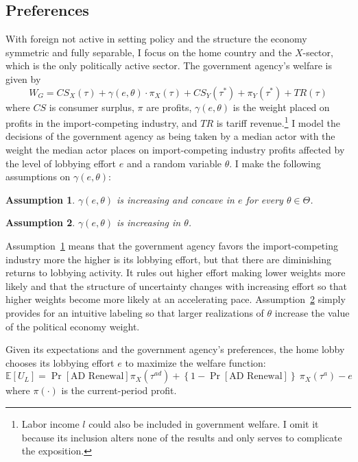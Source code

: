 \documentclass[10pt]{article}
\newtheorem{assumption}{Assumption}
\newcommand{\ve}{\theta}
\newcommand{\ta}{\theta}
\newcommand{\expect}{\mathbb{E}}
\newcommand{\ga}{\gamma}
\begin{document}
\subsection{Preferences}
\label{sec:pref}
With foreign not active in setting policy and the structure the economy symmetric and fully separable, I focus on the home country and the $X$-sector, which is the only politically active sector. The government agency's welfare is given by
\begin{equation}
  W_{\mathit{G}} = \mathit{CS}_X(\tau) + \ga(e,\ve) \cdot \pi_X(\tau) + \mathit{CS}_Y(\tau^*) + \pi_Y(\tau^*) + \mathit{TR}(\tau)
  \label{eq:ml}
\end{equation}
where $\mathit{CS}$ is consumer surplus, $\pi$ are profits, $\ga(e,\ta)$ is the weight placed on profits in the import-competing industry, and $\mathit{TR}$ is tariff revenue.\footnote{Labor income $l$ could also be included in government welfare. I omit it because its inclusion alters none of the results and only serves to complicate the exposition.} I model the decisions of the government agency as being taken by a median actor with the weight the median actor places on import-competing industry profits affected by the level of lobbying effort $e$ and a random variable $\ta$. I make the following assumptions on $\ga(e,\ta)$:

\begin{assumption}
  $\ga(e,\ta)$ is increasing and concave in $e$ for every $\ta \in \Theta$.
  \label{as:ga_c}
\end{assumption}

\begin{assumption}
  $\ga(e,\ta)$ is increasing in $\ta$.
  \label{as:ga_ta}
\end{assumption}

Assumption~\ref{as:ga_c} means that the government agency favors the import-competing industry more the higher is its lobbying effort, but that there are diminishing returns to lobbying activity. It rules out higher effort making lower weights more likely and that the structure of uncertainty changes with increasing effort so that higher weights become more likely at an accelerating pace. Assumption~\ref{as:ga_ta} simply provides for an intuitive labeling so that larger realizations of $\ta$ increase the value of the political economy weight.

Given its expectations and the government agency's preferences, the home lobby chooses its lobbying effort $e$ to maximize the welfare function:
\begin{equation}
  \expect \left[U_L \right] = \Pr\left[ \text{AD Renewal} \right]  \pi_X(\tau^{\mathit{ad}}) +\left\{1-\Pr\left[ \text{AD Renewal}\right]\right\} \ \pi_X(\tau^a) - e
  \label{eq:lv}
\end{equation}
where $\pi(\cdot)$ is the current-period profit. 
\end{document}
